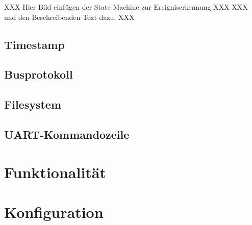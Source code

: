 XXX Hier Bild einfügen der State Machine zur Ereigniserkennung XXX
XXX und den Beschreibenden Text dazu. XXX

\subsection{Timestamp}\label{subsec.sw_timestamp}


\subsection{Busprotokoll}\label{subsec.sw_busprotokoll}


\subsection{Filesystem}\label{subsec.sw_filesystem}


\subsection{UART-Kommandozeile}\label{subsec.sw_uart}


\section{Funktionalität}\label{sec.sw_funktionalitaet}


\section{Konfiguration}\label{sec.sw_konfiguration}
